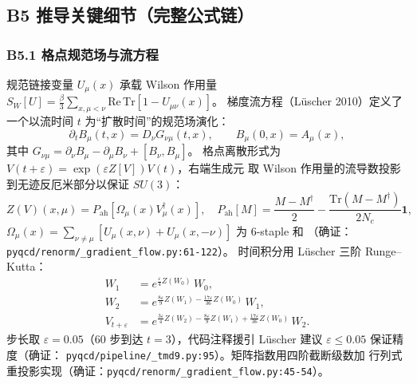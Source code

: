 \documentclass[UTF8]{ctexart}
\begin{document}
\subsection{B5 推导关键细节（完整公式链）}

\subsubsection{B5.1 格点规范场与流方程}
规范链接变量 $U_\mu(x)$ 承载 Wilson 作用量
$S_W[U]=\frac{\beta}{3}\sum_{x,\mu<\nu}\mathrm{Re\,Tr}[1-U_{\mu\nu}(x)]$。
梯度流方程（L\"uscher 2010）定义了一个以流时间 $t$ 为``扩散时间''的规范场演化：
\begin{equation}
\partial_t B_\mu(t,x) = D_\nu G_{\nu\mu}(t,x),\qquad
B_\mu(0,x)=A_\mu(x),
\label{eq:floweq}
\end{equation}
其中 $G_{\nu\mu}=\partial_\nu B_\mu-\partial_\mu B_\nu+[B_\nu,B_\mu]$。
格点离散形式为 $V(t+\varepsilon)=\exp(\varepsilon Z[V])V(t)$，右端生成元
取 Wilson 作用量的流导数投影到无迹反厄米部分以保证 $SU(3)$：
\begin{equation}
Z(V)(x,\mu)=P_{\mathrm{ah}}\!\left[\Omega_\mu(x)V^\dagger_\mu(x)\right],\quad
P_{\mathrm{ah}}[M]=\frac{M-M^\dagger}{2}-\frac{\mathrm{Tr}(M-M^\dagger)}{2N_c}\mathbf{1},
\label{eq:generator}
\end{equation}
$\Omega_\mu(x)=\sum_{\nu\neq\mu}[U_\mu(x,\nu)+U_\mu(x,-\nu)]$ 为 6-staple 和
（确证：\texttt{\nolinkurl{pyqcd/renorm/_gradient_flow.py:61-122}}）。
时间积分用 L\"uscher 三阶 Runge--Kutta：
\begin{align}
W_1 &= e^{\frac{\varepsilon}{4}Z(W_0)}\,W_0,\nonumber\\
W_2 &= e^{\frac{8\varepsilon}{9}Z(W_1)-\frac{17\varepsilon}{36}Z(W_0)}\,W_1,\nonumber\\
V_{t+\varepsilon} &= e^{\frac{3\varepsilon}{4}Z(W_2)-\frac{8\varepsilon}{9}Z(W_1)
+\frac{17\varepsilon}{36}Z(W_0)}\,W_2.
\label{eq:rk3}
\end{align}
步长取 $\varepsilon=0.05$（60 步到达 $t=3$），代码注释援引 L\"uscher 建议
$\varepsilon\le0.05$ 保证精度（确证：
\texttt{\nolinkurl{pyqcd/pipeline/_tmd9.py:95}}）。矩阵指数用四阶截断级数加
行列式重投影实现（确证：\texttt{\nolinkurl{pyqcd/renorm/_gradient_flow.py:45-54}}）。
\end{document}

